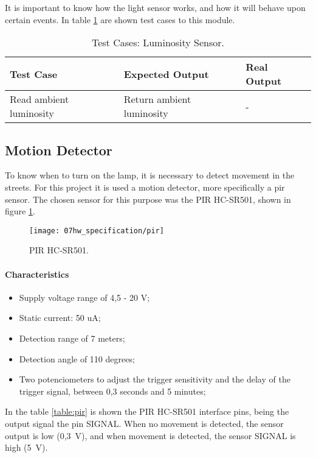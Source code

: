 It is important to know how the light sensor works, and how it will behave upon certain events. In table \ref{table:test_light_sen} are shown test cases to this module.

\begin{table}[H]
	\centering
	\resizebox{\columnwidth}{!}
	{
		\begin{tabular}{|m{3cm}|m{5cm}||m{5cm}|}
			\hline
			\textbf{Test Case} & \textbf{Expected Output} & \textbf{Real Output}
			\\\hline\hline
			Read ambient luminosity & Return ambient luminosity  & -
			\\\hline
		\end{tabular}
	}
	\caption{Test Cases: Luminosity Sensor.}
	\label{table:test_light_sen}
\end{table}

\subsection{Motion Detector}
To know when to turn on the lamp, it is necessary to detect movement in the streets. For this project it is used a motion detector, more specifically a \ac{pir} sensor. The chosen sensor for this purpose was the PIR HC-SR501, shown in figure \ref{fig:pir}.  \cite{pir}

\begin{figure}[H]
	\centering
	\texttt{[image: 07hw\_specification/pir]}
	\caption{PIR HC-SR501.}
	\label{fig:pir}
\end{figure}

\paragraph*{Characteristics}
\begin{itemize}
	\item Supply voltage range of 4,5 - 20 V;
	\item Static current: 50 uA;
	\item Detection range of 7 meters;
	\item Detection angle of 110 degrees;
	\item Two potenciometers to adjust the trigger sensitivity and the delay of the trigger signal, between 0,3 seconds and 5 minutes;
\end{itemize}

In the table \ref{table:pir} is shown the PIR HC-SR501 interface pins, being the output signal the pin SIGNAL. When no movement is detected, the sensor output is low (0,3~V), and when movement is detected, the sensor SIGNAL is high (5~V). 

